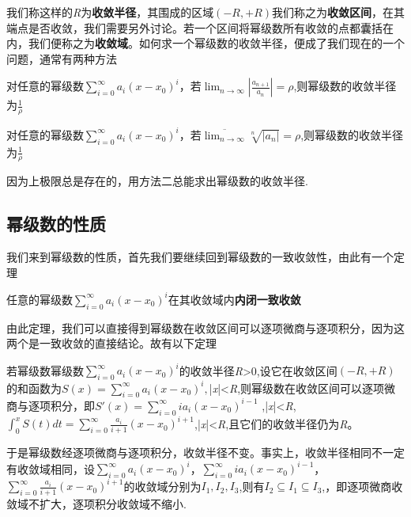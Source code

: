 \documentclass[lang=cn,10pt]{elegantbook}
\begin{document}
我们称这样的\textit{R}为\textbf{收敛半径}，其围成的区域$(-R,+R)$我们称之为\textbf{收敛区间}，在其端点是否收敛，我们需要另外讨论。若一个区间将幂级数所有收敛的点都囊括在内，我们便称之为\textbf{收敛域}。如何求一个幂级数的收敛半径，便成了我们现在的一个问题，通常有两种方法

\begin{theorem}
	对任意的幂级数$\sum_{i=0}^{\infty } a_{i} (x-x_{0} )^{i} $，若$\lim_{n \to \infty} |\frac{a_{n+1} }{a_{n}} |=\rho $,则幂级数的收敛半径为$\frac{1}{\rho}$ 
\end{theorem}

\begin{theorem}
	对任意的幂级数$\sum_{i=0}^{\infty } a_{i} (x-x_{0} )^{i} $，若$\overline{ \lim_{n \to \infty}}  \sqrt[n]{|a_{n} |}  =\rho $,则幂级数的收敛半径为$\frac{1}{\rho}$ 
\end{theorem}

因为上极限总是存在的，用方法二总能求出幂级数的收敛半径.

\subsection{幂级数的性质}
我们来到幂级数的性质，首先我们要继续回到幂级数的一致收敛性，由此有一个定理
\begin{theorem}[Abel第二定理]
	任意的幂级数$\sum_{i=0}^{\infty } a_{i} (x-x_{0} )^{i} $在其收敛域内\textbf{内闭一致收敛}
\end{theorem}

由此定理，我们可以直接得到幂级数在收敛区间可以逐项微商与逐项积分，因为这两个是一致收敛的直接结论。故有以下定理

\begin{theorem}[定理]
	若幂级数幂级数$\sum_{i=0}^{\infty } a_{i} (x-x_{0} )^{i} $的收敛半径\textit{R}>0,设它在收敛区间$(-R,+R)$的和函数为$S(x)=\sum_{i=0}^{\infty } a_{i} (x-x_{0} )^{i}, $|\textit{x}|<\textit{R},则幂级数在收敛区间可以逐项微商与逐项积分，即${S }' (x)=\sum_{i=0}^{\infty } ia_{i} (x-x_{0} )^{i-1}$ ,|\textit{x}|<\textit{R},$\int_{0}^{x} {S } (t) dt=\sum_{i=0}^{\infty } \frac{a_{i}}{i+1} (x-x_{0} )^{i+1}$,|\textit{x}|<\textit{R},且它们的收敛半径仍为\textit{R}。
\end{theorem}

于是幂级数经逐项微商与逐项积分，收敛半径不变。事实上，收敛半径相同不一定有收敛域相同，设$\sum_{i=0}^{\infty } a_{i} (x-x_{0} )^{i} $，$\sum_{i=0}^{\infty } ia_{i} (x-x_{0} )^{i-1}$，$\sum_{i=0}^{\infty } \frac{a_{i}}{i+1} (x-x_{0} )^{i+1}$的收敛域分别为$I_{1},I_{2},I_{3}$,则有$I_{2}\subseteq I_{1}\subseteq I_{3}$,，即逐项微商收敛域不扩大，逐项积分收敛域不缩小.
\end{document}
